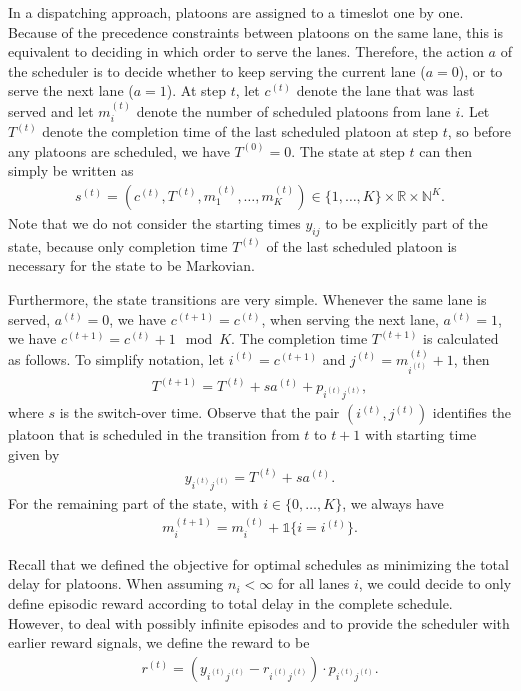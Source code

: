 \documentclass{article}
\theoremstyle{definition}
\theoremstyle{plain}
\begin{document}
In a dispatching approach, platoons are assigned to a timeslot one by one.
Because of the precedence constraints between platoons on the same lane, this is
equivalent to deciding in which order to serve the lanes. Therefore, the action
$a$ of the scheduler is to decide whether to keep serving the current lane
($a = 0$), or to serve the next lane ($a = 1$).
At step $t$, let $c^{(t)}$ denote the lane that was last served and let
$m_{i}^{(t)}$ denote the number of scheduled platoons from lane $i$. Let
$T^{(t)}$ denote the completion time of the last scheduled platoon at step $t$,
so before any platoons are scheduled, we have $T^{(0)} = 0$. The state at step
$t$ can then simply be written as
\begin{align}
   s^{(t)} = (c^{(t)}, T^{(t)}, m_{1}^{(t)}, \dots, m_{K}^{(t)} ) \in \{1, \dots, K\} \times \mathbb{R} \times \mathbb{N}^{K} .
\end{align}
Note that we do not consider the starting times $y_{ij}$ to be explicitly part
of the state, because only completion time $T^{(t)}$ of the last scheduled
platoon is necessary for the state to be Markovian.

Furthermore, the state transitions are very simple. Whenever the same lane is
served, $a^{(t)}=0$, we have $c^{(t+1)} = c^{(t)}$, when serving the next lane,
$a^{(t)}=1$, we have $c^{(t+1)} = c^{(t)} + 1 \mod K$. The completion time
$T^{(t+1)}$ is calculated as follows. To simplify notation, let
$i^{(t)} = c^{(t+1)}$ and $j^{(t)} = m_{i^{(t)}}^{(t)} + 1$, then
\begin{align}
  T^{(t+1)} = T^{(t)} + s a^{(t)} + p_{i^{(t)}j^{(t)}} ,
\end{align}
where $s$ is the switch-over time. Observe that the pair $(i^{(t)}, j^{(t)})$
identifies the platoon that is scheduled in the transition from $t$ to $t+1$
with starting time given by
\begin{align}
  y_{i^{(t)}j^{(t)}} = T^{(t)} + s a^{(t)} .
\end{align}
For the remaining part of the state, with $i \in \{0, \dots, K\}$, we always
have
\begin{align}
  m_{i}^{(t+1)} = m_{i}^{(t)} + \mathbb{1}\{ i = i^{(t)} \} .
\end{align}

Recall that we defined the objective for optimal schedules as minimizing the
total delay for platoons. When assuming $n_{i} < \infty$ for all lanes $i$, we
could decide to only define episodic reward according to total delay in the
complete schedule. However, to deal with possibly infinite episodes and to
provide the scheduler with earlier reward signals, we define the reward to be
\begin{align}
  r^{(t)} = (y_{i^{(t)}j^{(t)}} - r_{i^{(t)}j^{(t)}}) \cdot p_{i^{(t)}j^{(t)}} .
\end{align}
\end{document}
